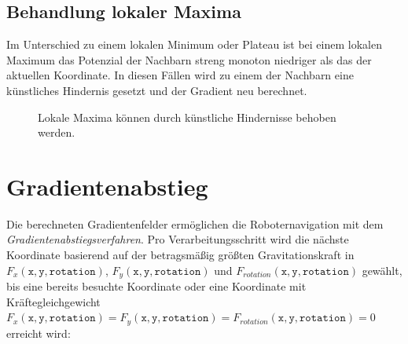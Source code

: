 \subsection{Behandlung lokaler Maxima}

Im Unterschied zu einem lokalen Minimum oder Plateau ist bei einem lokalen Maximum das Potenzial der Nachbarn streng monoton niedriger als das der aktuellen Koordinate.
In diesen Fällen wird zu einem der Nachbarn eine künstliches Hindernis gesetzt und der Gradient neu berechnet.
\begin{figure}[H]
	\centering
	\footnotesize
	\centerline{\resizebox{0.9\linewidth}{!}{}}
	\caption{Lokale Maxima können durch künstliche Hindernisse behoben werden.}
\end{figure}


\section{Gradientenabstieg}

Die berechneten Gradientenfelder ermöglichen die Roboternavigation mit dem \textit{Gradientenabstiegsverfahren}. Pro Verarbeitungsschritt wird die nächste Koordinate basierend auf der betragsmäßig größten Gravitationskraft in $F_{x}(\texttt{x}, \texttt{y}, \texttt{rotation})$, $F_{y}(\texttt{x}, \texttt{y}, \texttt{rotation})$ und $F_{rotation}(\texttt{x}, \texttt{y}, \texttt{rotation})$ gewählt, bis eine bereits besuchte Koordinate oder eine Koordinate mit Kräftegleichgewicht $F_{x}(\texttt{x}, \texttt{y}, \texttt{rotation}) = F_{y}(\texttt{x}, \texttt{y}, \texttt{rotation}) = F_{rotation}(\texttt{x}, \texttt{y}, \texttt{rotation}) = 0$ erreicht wird:

